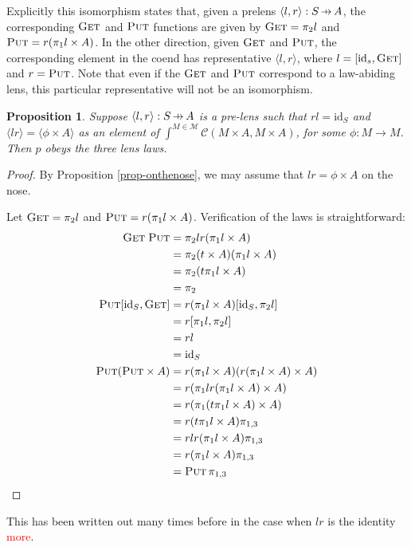 \documentclass[11pt,a4paper]{article}
\theoremstyle{plain}
\newtheorem{proposition}[theorem]{Proposition}
\theoremstyle{definition}
\newcommand{\C}{\mathscr{C}}
\newcommand{\M}{\mathscr{M}}
\newcommand{\id}{\mathrm{id}}
\newcommand{\fget}{\textsc{Get}}
\newcommand{\fput}{\textsc{Put}}
\newcommand{\hto}{\ensuremath{\,\mathaccent\shortmid\rightarrow\,}}
\newcommand{\todo}[1]{\textcolor{red}{\small #1}}
\begin{document}
Explicitly this isomorphism states that, given a prelens $\langle l, r \rangle : S \hto A$, the corresponding $\fget$ and $\fput$ functions are given by $\fget = \pi_2 l$ and $\fput = r (\pi_1 l \times A)$. In the other direction, given $\fget$ and $\fput$, the corresponding element in the coend has representative $\langle l, r \rangle$, where $l = [\id_s, \fget]$ and $r = \fput$. Note that even if the $\fget$ and $\fput$ correspond to a law-abiding lens, this particular representative will not be an isomorphism.

\begin{proposition}
\label{prop-OpticImpliesLensLaws}
Suppose $\langle l, r \rangle : S \hto A$ is a pre-lens such that $rl = \id_S$ and $\langle lr \rangle = \langle \phi \times A \rangle$ as an element of $\int^{M \in \M} \C(M \times A, M \times A)$, for some $\phi : M \to M$. Then $p$ obeys the three lens laws.
\end{proposition}
\begin{proof}
By Proposition \ref{prop-onthenose}, we may assume that $lr = \phi \times A$ on the nose.

Let $\fget = \pi_2 l$ and $\fput = r (\pi_1 l \times A)$. Verification of the laws is straightforward:
\begin{align*}
\fget \; \fput 
&= \pi_2 l r (\pi_1 l \times A) \\
&= \pi_2 (t \times A) (\pi_1 l \times A) \\
&= \pi_2 (t \pi_1 l \times A) \\
&= \pi_2 \\
\fput [\id_S, \fget] 
&= r (\pi_1 l \times A) [\id_S, \pi_2 l] \\
&= r [\pi_1 l, \pi_2 l] \\
&= rl \\
&= \id_S \\
\fput (\fput \times A) 
&= r (\pi_1 l \times A) (r (\pi_1 l \times A) \times A) \\
&= r (\pi_1 l  r (\pi_1 l \times A) \times A) \\
&= r (\pi_1 (t\pi_1 l \times A) \times A) \\
&= r (t\pi_1 l \times A) \pi_{1,3} \\
&= r lr(\pi_1 l \times A) \pi_{1,3} \\
&= r(\pi_1 l \times A) \pi_{1,3} \\
&= \fput \, \pi_{1, 3}
\end{align*}
\end{proof}

This has been written out many times before in the case when $lr$ is the identity \cite{IsomorphismLensesPost} \todo{more}.
\end{document}
